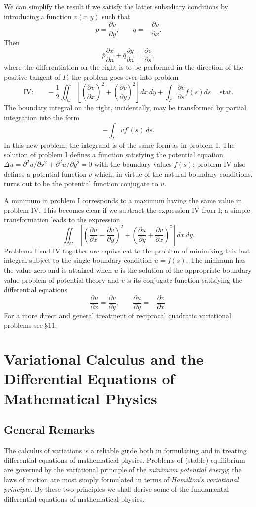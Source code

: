 We can simplify the result if we satisfy the latter subsidiary conditions by introducing a function $v(x,y)$ such that
\[
p=\frac{\partial v}{\partial y},\qquad q=-\frac{\partial v}{\partial x}.
\]
Then
\[
\bar p\frac{\partial x}{\partial n}+\bar q\frac{\partial y}{\partial n}=\frac{\partial v}{\partial s},
\]
where the differentiation on the right is to be performed in the direction of the positive tangent of $\Gamma$; the problem goes over into problem
\[
\text{IV:}\qquad -\frac12\iint_G\left[\left(\frac{\partial v}{\partial x}\right)^2+\left(\frac{\partial v}{\partial y}\right)^2\right]dx\,dy
+\int_\Gamma\frac{\partial v}{\partial s}f(s)ds=\text{stat.}
\]
The boundary integral on the right, incidentally, may be transformed by partial integration into the form
\[
-\int_\Gamma v f'(s)\,ds.
\]
In this new problem, the integrand is of the same form as in problem I. The solution of problem I defines a function satisfying the potential equation $\Delta u=\partial^2u/\partial x^2+\partial^2u/\partial y^2=0$ with the boundary values $f(s)$; problem IV also defines a potential function $v$ which, in virtue of the natural boundary conditions, turns out to be the potential function conjugate to $u$.

A minimum in problem I corresponds to a maximum having the same value in problem IV. This becomes clear if we subtract the expression IV from I; a simple transformation leads to the expression
\[
\iint_G\left[\left(\frac{\partial u}{\partial x}-\frac{\partial v}{\partial y}\right)^2+\left(\frac{\partial u}{\partial y}+\frac{\partial v}{\partial x}\right)^2\right]dx\,dy.
\]
Problems I and IV together are equivalent to the problem of minimizing this last integral subject to the single boundary condition $\bar u=f(s)$. The minimum has the value zero and is attained when $u$ is the solution of the appropriate boundary value problem of potential theory and $v$ is its conjugate function satisfying the differential equations
\[
\frac{\partial u}{\partial x}=\frac{\partial v}{\partial y},\qquad
\frac{\partial u}{\partial y}=-\frac{\partial v}{\partial x}.
\]
For a more direct and general treatment of reciprocal quadratic variational problems see \S11.

\section{Variational Calculus and the Differential Equations of Mathematical Physics}
\subsection{General Remarks}
The calculus of variations is a reliable guide both in formulating and in treating differential equations of mathematical physics. Problems of (stable) equilibrium are governed by the variational principle of the \emph{minimum potential energy}; the laws of motion are most simply formulated in terms of \emph{Hamilton's variational principle}. By these two principles we shall derive some of the fundamental differential equations of mathematical physics.

